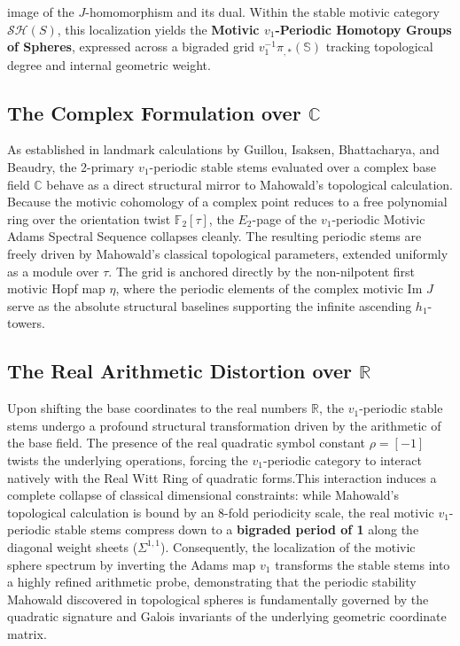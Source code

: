 \documentclass[11pt,oneside]{article}
\begin{document}
image of the $J$-homomorphism and its dual. Within the stable motivic category $\mathcal{S}\mathcal{H}(S)$, this localization yields the \textbf{Motivic $v_1$-Periodic Homotopy Groups of Spheres}, expressed across a bigraded grid $v_1^{-1}\pi_{,*}(\mathbb{S})$ tracking topological degree and internal geometric weight.\subsection{The Complex Formulation over $\mathbb{C}$}As established in landmark calculations by Guillou, Isaksen, Bhattacharya, and Beaudry, the 2-primary $v_1$-periodic stable stems evaluated over a complex base field $\mathbb{C}$ behave as a direct structural mirror to Mahowald's topological calculation. Because the motivic cohomology of a complex point reduces to a free polynomial ring over the orientation twist $\mathbb{F}_2[\tau]$, the $E_2$-page of the $v_1$-periodic Motivic Adams Spectral Sequence collapses cleanly. The resulting periodic stems are freely driven by Mahowald's classical topological parameters, extended uniformly as a module over $\tau$. The grid is anchored directly by the non-nilpotent first motivic Hopf map $\eta$, where the periodic elements of the complex motivic $\text{Im } J$ serve as the absolute structural baselines supporting the infinite ascending $h_1$-towers.\subsection{The Real Arithmetic Distortion over $\mathbb{R}$}Upon shifting the base coordinates to the real numbers $\mathbb{R}$, the $v_1$-periodic stable stems undergo a profound structural transformation driven by the arithmetic of the base field. The presence of the real quadratic symbol constant $\rho = [-1]$ twists the underlying operations, forcing the $v_1$-periodic category to interact natively with the Real Witt Ring of quadratic forms.This interaction induces a complete collapse of classical dimensional constraints: while Mahowald's topological calculation is bound by an 8-fold periodicity scale, the real motivic $v_1$-periodic stable stems compress down to a \textbf{bigraded period of 1} along the diagonal weight sheets ($\Sigma^{1,1}$). Consequently, the localization of the motivic sphere spectrum by inverting the Adams map $v_1$ transforms the stable stems into a highly refined arithmetic probe, demonstrating that the periodic stability Mahowald discovered in topological spheres is fundamentally governed by the quadratic signature and Galois invariants of the underlying geometric coordinate matrix.
\end{document}
